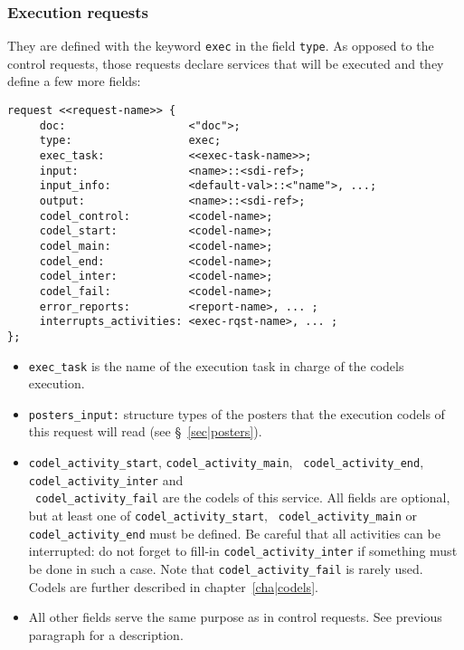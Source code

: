 \subsubsection{Execution requests}

They are defined with the keyword {\tt exec} in the field {\tt type}. As
opposed to the control requests, those requests declare services that
will be executed and they define a few more fields:

\begin{center}\begin{cartouche}\small\begin{verbatim}
request <<request-name>> {
     doc:                   <"doc">;
     type:                  exec;
     exec_task:             <<exec-task-name>>;
     input:                 <name>::<sdi-ref>;
     input_info:            <default-val>::<"name">, ...;
     output:                <name>::<sdi-ref>;
     codel_control:         <codel-name>;
     codel_start:           <codel-name>;
     codel_main:            <codel-name>;
     codel_end:             <codel-name>;
     codel_inter:           <codel-name>;
     codel_fail:            <codel-name>;
     error_reports:         <report-name>, ... ;
     interrupts_activities: <exec-rqst-name>, ... ;
};
\end{verbatim}\end{cartouche}\end{center}

\begin{itemize}
\item {\tt exec\_task} is the name of the execution task in charge of the
codels execution.

\item {\tt posters\_input:} structure types of the posters that the
execution codels of this request will read (see \S~\vref{sec|posters}).

\item {\tt codel\_activity\_start}, {\tt codel\_activity\_main}, {\tt
codel\_activity\_end}, {\tt codel\_activity\_inter} and \\ {\tt
codel\_activity\_fail} are the codels of this service.  All fields are
optional, but at least one of {\tt codel\_activity\_start}, {\tt
codel\_activity\_main} or {\tt codel\_activity\_end} must be defined.
Be careful that all activities can be interrupted: do not forget to
fill-in {\tt codel\_activity\_inter} if something must be done in such a
case.
Note that {\tt codel\_activity\_fail} is rarely used.
Codels are further described in chapter~\ref{cha|codels}.


\item All other fields serve the same purpose  as in control  requests.
See previous paragraph for a description.

\end{itemize}


